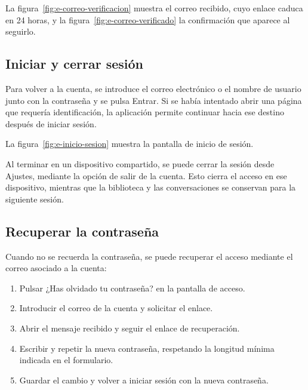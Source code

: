 La figura~\ref{fig:e-correo-verificacion} muestra el correo recibido, cuyo
enlace caduca en 24 horas, y la figura~\ref{fig:e-correo-verificado} la
confirmación que aparece al seguirlo.



\subsection{Iniciar y cerrar sesión}
\label{sec:e-sesion}

Para volver a la cuenta, se introduce el correo electrónico o el nombre de
usuario junto con la contraseña y se pulsa
\guillemotleft{}Entrar\guillemotright{}. Si se había intentado abrir una
página que requería identificación, la aplicación permite continuar hacia
ese destino después de iniciar sesión.

La figura~\ref{fig:e-inicio-sesion} muestra la pantalla de inicio de sesión.


Al terminar en un dispositivo compartido, se puede cerrar la sesión desde
\guillemotleft{}Ajustes\guillemotright{}, mediante la opción de salir de la
cuenta. Esto cierra el acceso en ese dispositivo, mientras que la biblioteca
y las conversaciones se conservan para la siguiente sesión.

\subsection{Recuperar la contraseña}
\label{sec:e-recuperar-contrasena}

Cuando no se recuerda la contraseña, se puede recuperar el acceso mediante
el correo asociado a la cuenta:

\begin{enumerate}
    \item Pulsar \guillemotleft{}¿Has olvidado tu contraseña?\guillemotright{}
    en la pantalla de acceso.
    \item Introducir el correo de la cuenta y solicitar el enlace.
    \item Abrir el mensaje recibido y seguir el enlace de recuperación.
    \item Escribir y repetir la nueva contraseña, respetando la longitud
    mínima indicada en el formulario.
    \item Guardar el cambio y volver a iniciar sesión con la nueva
    contraseña.
\end{enumerate}

